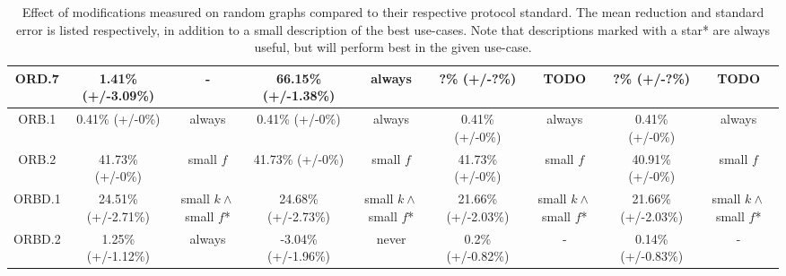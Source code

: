 \begin{table*}
{\begin{tabular}{c|cc|cc|cc|cc|}
\multicolumn{1}{|c|}{ORD.7}       & 1.41\% (+/-3.09\%)            & -               & 66.15\% (+/-1.38\%)             & always               & ?\% (+/-?\%)            & TODO               & ?\% (+/-?\%)             & TODO               \\ \hline
\multicolumn{1}{|c|}{ORB.1}       & 0.41\% (+/-0\%)            & always               & 0.41\% (+/-0\%)             & always               & 0.41\% (+/-0\%)            & always               & 0.41\% (+/-0\%)             & always               \\ \hline
\multicolumn{1}{|c|}{ORB.2}       & 41.73\% (+/-0\%)            & small $f$               & 41.73\% (+/-0\%)             & small $f$               & 41.73\% (+/-0\%)            & small $f$               & 40.91\% (+/-0\%)             & small $f$               \\ \hline
\multicolumn{1}{|c|}{ORBD.1}      & 24.51\% (+/-2.71\%)            & small $k \wedge$ small $f$*                & 24.68\% (+/-2.73\%)             & small $k \wedge$ small $f$*                 & 21.66\% (+/-2.03\%)            & small $k \wedge$ small $f$*                 & 21.66\% (+/-2.03\%)             & small $k \wedge$ small $f$*                 \\ \hline
\multicolumn{1}{|c|}{ORBD.2}      & 1.25\% (+/-1.12\%)            & always               & -3.04\% (+/-1.96\%)             & never               & 0.2\% (+/-0.82\%)            & -               & 0.14\% (+/-0.83\%)             & -               \\ \hline
\end{tabular}
    }
  \caption{Effect of modifications measured on random graphs compared to their respective protocol standard. The mean reduction and standard error is listed respectively, in addition to a small description of the best use-cases. Note that descriptions marked with a star* are always useful, but will perform best in the given use-case.}
  \label{eval:individual-results}
\end{table*}
\vspace{-0.10in}

